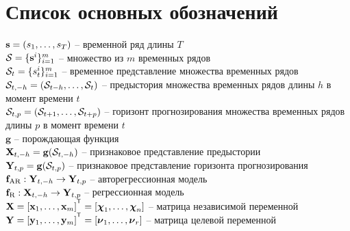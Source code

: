 \chapter*{Список основных обозначений}
\noindent $\mathbf{s} = (s_1, \dots, s_T)$ -- временной ряд длины $T$ \\
$\mathcal{S} = \{\mathbf{s}^i\}_{i=1}^m$ -- множество из $m$ временных рядов \\
$\mathcal{S}_t = \{s^i_t\}_{i=1}^m$ -- временное представление множества временных рядов \\
$\mathcal{S}_{t, -h} = (\mathcal{S}_{t - h}, \dots, \mathcal{S}_{t})$ -- предыстория множества временных рядов длины $h$ в момент времени $t$ \\
$\mathcal{S}_{t, p} = (\mathcal{S}_{t + 1}, \dots, \mathcal{S}_{t + p})$ -- горизонт прогнозирования множества временных рядов длины $p$ в момент времени $t$ \\
$\mathbf{g}$ -- порождающая функция \\
$\mathbf{X}_{t, -h} = \mathbf{g}(\mathcal{S}_{t, -h})$ -- признаковое представление предыстории \\
$\mathbf{Y}_{t, p} = \mathbf{g}(\mathcal{S}_{t, p})$ -- признаковое представление горизонта прогнозирования \\
$\mathbf{f}_{\text{AR}}: \mathbf{Y}_{t, -h} \rightarrow \mathbf{Y}_{t, p}$ -- авторегрессионная модель \\
$\mathbf{f}_{\text{R}}: \mathbf{X}_{t, -h} \rightarrow \mathbf{Y}_{t, p}$ -- регрессионная модель \\
$\bX = [\bx_1, \dots, \bx_m]^{\T} =  [\bchi_1, \dots, \bchi_n]$ -- матрица независимой переменной \\
$\bY = [\by_1, \dots, \by_m]^{\T} =  [\bnu_1, \dots, \bnu_r]$ -- матрица целевой переменной \\



